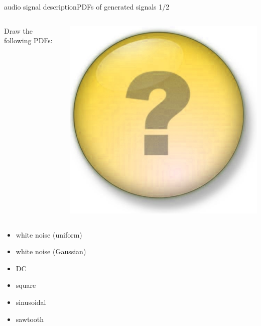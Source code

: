 \begin{frame}{audio signal description}{PDFs of generated signals 1/2}
	\vspace{-15mm}
	\begin{columns}
		\column{5cm}
		Draw the following PDFs:
		
		\column{4cm}
		\begin{flushright}
			 \includegraphics[scale=.08]{Graph/question-mark}
		\end{flushright}
	\end{columns}
	\pause
	\begin{itemize}
		\item	white noise (uniform)
		\item	white noise (Gaussian)
		\item	DC
		\item	square
		\item	sinusoidal
		\item	sawtooth
	\end{itemize}
\end{frame}	
	
